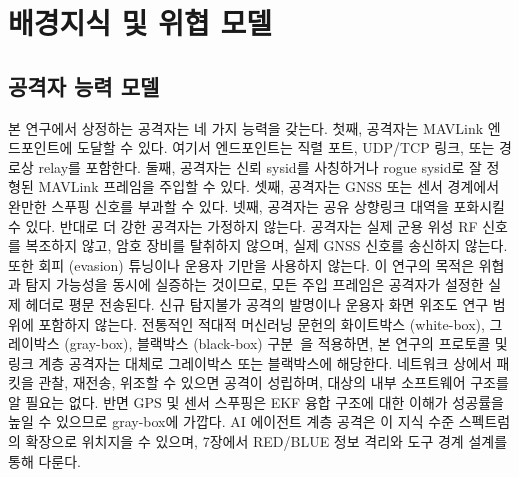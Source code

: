 \section{배경지식 및 위협 모델}

\subsection{공격자 능력 모델}


본 연구에서 상정하는 공격자는 네 가지 능력을 갖는다. 
%
첫째, 공격자는 MAVLink 엔드포인트에 도달할 수 있다. 
%
여기서 엔드포인트는 직렬 포트, UDP/TCP 링크, 또는 경로상 relay를 포함한다. 
%
둘째, 공격자는 신뢰 sysid를 사칭하거나 rogue sysid로 잘 정형된 MAVLink 프레임을 주입할 수 있다. 
%
셋째, 공격자는 GNSS 또는 센서 경계에서 완만한 스푸핑 신호를 부과할 수 있다. 
%
넷째, 공격자는 공유 상향링크 대역을 포화시킬 수 있다.
%
반대로 더 강한 공격자는 가정하지 않는다. 공격자는 실제 군용 위성 RF 신호를 복조하지 않고, 암호 장비를 탈취하지 않으며, 실제 GNSS 신호를 송신하지 않는다. 또한 회피 (evasion) 튜닝이나 운용자 기만을 사용하지 않는다. 이 연구의 목적은 위협과 탐지 가능성을 동시에 실증하는 것이므로, 모든 주입 프레임은 공격자가 설정한 실제 헤더로 평문 전송된다. 신규 탐지불가 공격의 발명이나 운용자 화면 위조도 연구 범위에 포함하지 않는다.
%
전통적인 적대적 머신러닝 문헌의 화이트박스 (white-box), 그레이박스 (gray-box), 블랙박스 (black-box) 구분~\cite{nist_aml}을 적용하면, 본 연구의 프로토콜 및 링크 계층 공격자는 대체로 그레이박스 또는 블랙박스에 해당한다. 
%
네트워크 상에서 패킷을 관찰, 재전송, 위조할 수 있으면 공격이 성립하며, 대상의 내부 소프트웨어 구조를 알 필요는 없다. 
%
반면 GPS 및 센서 스푸핑은 EKF 융합 구조에 대한 이해가 성공률을 높일 수 있으므로 gray-box에 가깝다. 
%
AI 에이전트 계층 공격은 이 지식 수준 스펙트럼의 확장으로 위치지을 수 있으며, 7장에서 RED/BLUE 정보 격리와 도구 경계 설계를 통해 다룬다.

